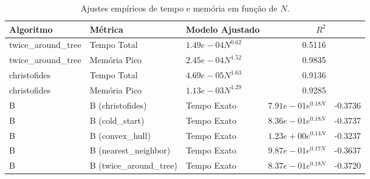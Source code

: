 \begin{table}[htbp]
\centering
\caption{Ajustes empíricos de tempo e memória em função de $N$.}
\label{tab:ajuste_complexidade}
\begin{tabular}{lllr}
\hline
Algoritmo & Métrica & Modelo Ajustado & $R^2$ \\
\hline
twice\_around\_tree & Tempo Total & $1.49e-04 N^{0.62}$ & 0.5116 \\
twice\_around\_tree & Memória Pico & $2.45e-04 N^{1.52}$ & 0.9835 \\
christofides & Tempo Total & $4.69e-05 N^{1.63}$ & 0.9136 \\
christofides & Memória Pico & $1.13e-03 N^{1.29}$ & 0.9285 \\
B&B (christofides) & Tempo Exato & $7.91e-01 e^{0.18N}$ & -0.3736 \\
B&B (cold\_start) & Tempo Exato & $8.36e-01 e^{0.18N}$ & -0.3737 \\
B&B (convex\_hull) & Tempo Exato & $1.23e+00 e^{0.14N}$ & -0.3237 \\
B&B (nearest\_neighbor) & Tempo Exato & $9.87e-01 e^{0.17N}$ & -0.3637 \\
B&B (twice\_around\_tree) & Tempo Exato & $8.37e-01 e^{0.18N}$ & -0.3720 \\
\hline
\end{tabular}
\end{table}
